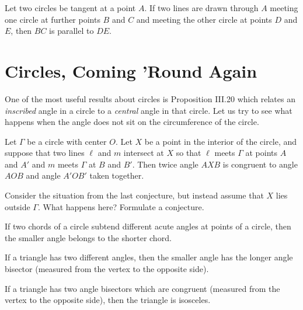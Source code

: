 \begin{conjecture}\label{conj:tangent-to-two-circles}
Let two circles be tangent at a point $A$. If two lines are drawn through $A$ meeting one circle at further points $B$ and $C$ and meeting the other circle at points $D$ and $E$, then $BC$ is parallel to $DE$.
\end{conjecture}



\chapter{Circles, Coming 'Round Again}
One of the most useful results about circles is Proposition III.20 which relates an \emph{inscribed} angle in a circle to a \emph{central} angle in that circle.
Let us try to see what happens when the angle does not sit on the circumference of the circle.

\begin{conjecture}
Let $\Gamma$ be a circle with center $O$. Let $X$ be a point in the interior of the circle, and suppose that two lines $\ell$ and $m$ intersect at $X$ so that $\ell$ meets $\Gamma$ at points $A$ and $A'$ and $m$ meets $\Gamma$ at $B$ and $B'$.
Then twice angle $AXB$ is congruent to angle $AOB$ and angle $A'OB'$ taken together.
\end{conjecture}

\begin{question}
Consider the situation from the last conjecture, but instead assume that $X$ lies outside $\Gamma$. What happens here? Formulate a conjecture.
\end{question}


\begin{conjecture}
If two chords of a circle subtend different acute angles at points of a circle, then the smaller angle belongs to the shorter chord.
\end{conjecture}

\begin{conjecture}
If a triangle has two different angles, then the smaller angle has the longer angle bisector (measured from the vertex to the opposite side).
\end{conjecture}

\begin{conjecture}
If a triangle has two angle bisectors which are congruent (measured from the vertex to the opposite side), then the triangle is isosceles.
\end{conjecture}

